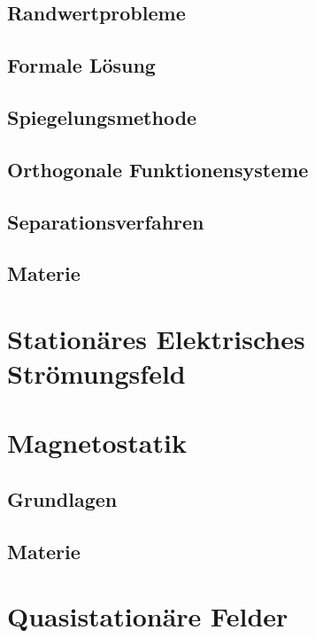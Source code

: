 \subsection{Randwertprobleme}

\subsection{Formale Lösung}

\subsection{Spiegelungsmethode}

\subsection{Orthogonale Funktionensysteme}

\subsection{Separationsverfahren}

\subsection{Materie}

\section{Stationäres Elektrisches Strömungsfeld}

\section{Magnetostatik}
\subsection{Grundlagen}

\subsection{Materie}

\section{Quasistationäre Felder}
